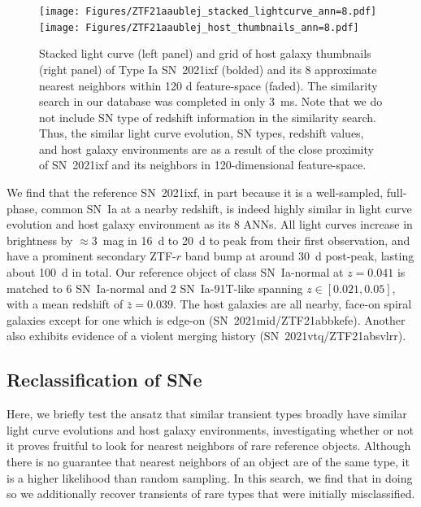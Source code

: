 \documentclass[twocolumn]{aastex63}
\begin{document}
\begin{figure}
    \centering
    \texttt{[image: Figures/ZTF21aaublej\_stacked\_lightcurve\_ann=8.pdf]}
    \texttt{[image: Figures/ZTF21aaublej\_host\_thumbnails\_ann=8.pdf]}
    \caption{
    Stacked light curve (left panel) and grid of host galaxy thumbnails (right panel) of Type Ia SN~2021ixf (bolded) and its 8 approximate nearest neighbors within 120 d feature-space (faded). The similarity search in our database was completed in only 3~ms. Note that we do not include SN type of redshift information in the similarity search. Thus, the similar light curve evolution, SN types, redshift values, and host galaxy environments are as a result of the close proximity of SN~2021ixf and its neighbors in 120-dimensional feature-space.
    } 
    \label{fig:lc+host}
\end{figure}

We find that the reference SN~2021ixf, in part because it is a well-sampled, full-phase, common SN~Ia at a nearby redshift, is indeed highly similar in light curve evolution and host galaxy environment as its 8 ANNs. All light curves increase in brightness by $\approx$3~mag in 16~d to 20~d to peak from their first observation, and have a prominent secondary ZTF-$r$ band bump at around 30~d post-peak, lasting about 100~d in total. Our reference object of class SN~Ia-normal at $z=0.041$ is matched to 6 SN~Ia-normal and 2 SN~Ia-91T-like spanning $z\in[0.021, 0.05]$, with a mean redshift of $\bar{z}=0.039$. The host galaxies are all nearby, face-on spiral galaxies except for one which is edge-on (SN~2021mid/ZTF21abbkefe). Another also exhibits evidence of a violent merging history (SN~2021vtq/ZTF21absvlrr). \par

\subsection{Reclassification of SNe}  \label{subsec:reclass_sne}

Here, we briefly test the ansatz that similar transient types broadly have similar light curve evolutions and host galaxy environments, investigating whether or not it proves fruitful to look for nearest neighbors of rare reference objects. Although there is no guarantee that nearest neighbors of an object are of the same type, it is a higher likelihood than random sampling. In this search, we find that in doing so we additionally recover transients of rare types that were initially misclassified.
\end{document}
